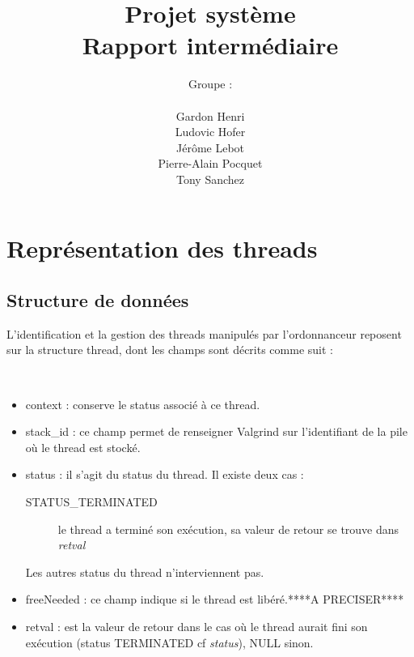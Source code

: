 \documentclass{article}
\author{Groupe :\\ \\Gardon Henri\\Ludovic Hofer\\Jérôme Lebot\\Pierre-Alain Pocquet\\Tony Sanchez}
\title{Projet système \\ Rapport intermédiaire}
\begin{document}
\maketitle


\section{Représentation des threads}

\subsection{Structure de données}

L'identification et la gestion des threads manipulés par l'ordonnanceur reposent sur
la structure thread, dont les champs sont décrits comme suit :

    \noindent\parindent11.10839pt
\\
\begin{itemize}
    \item context : conserve le status associé à ce thread.
    \item stack\_id : ce champ permet de renseigner Valgrind sur l'identifiant de la pile où le thread est stocké. 
    \item status : il s'agit du status du thread. Il existe deux cas :
    \begin{description}
        \item[STATUS\_TERMINATED]le thread a terminé son exécution, sa valeur de retour se trouve dans \textit{retval}
    \end{description}
    Les autres status du thread n'interviennent pas.
    \item freeNeeded : ce champ indique si le thread est libéré.****A PRECISER****
    \item retval : est la valeur de retour dans le cas où le thread aurait fini son exécution (status TERMINATED cf \textit{status}), NULL sinon.
\end{itemize}
\end{document}
